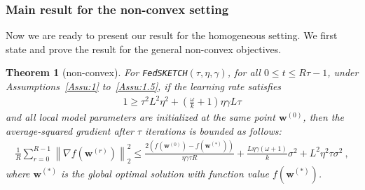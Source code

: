 \documentclass[11pt]{article}
\newtheorem{theorem}{Theorem}
\begin{document}
\subsubsection{Main result for the non-convex setting}
Now we are ready to present our result for the homogeneous setting. We first state and prove the result for the general non-convex objectives.  
\begin{theorem}[non-convex]\label{thm:lsgwd-lr} For \texttt{FedSKETCH}$(\tau, \eta, \gamma)$, for all $0\leq t\leq R\tau-1$,  under Assumptions~\ref{Assu:1} to~\ref{Assu:1.5}, if the learning rate satisfies \begin{align}
   1\geq {\tau^2 L^2\eta^2}+\left(\frac{\omega}{k}+1\right){\eta\gamma L}{\tau}
\label{eq:cnd-thm4.3}
\end{align}
and all local model parameters are initialized at the same point ${\boldsymbol{w}}^{(0)}$, then the average-squared gradient after $\tau$ iterations is bounded as follows:
\begin{align}
        \frac{1}{R}\sum_{r=0}^{R-1}\left\|\nabla f({\boldsymbol{w}}^{(r)})\right\|_2^2\leq \frac{2\left(f(\boldsymbol{w}^{(0)})-f(\boldsymbol{w}^{(*)})\right)}{\eta\gamma\tau R}+\frac{L\eta\gamma{\left(\omega+1\right)}}{k}\sigma^2+{L^2\eta^2\tau }\sigma^2 \ , \label{eq:thm1-result} 
\end{align}
where $\boldsymbol{w}^{(*)}$ is the global optimal solution with  function value $f(\boldsymbol{w}^{(*)})$.
\end{theorem}
\end{document}
